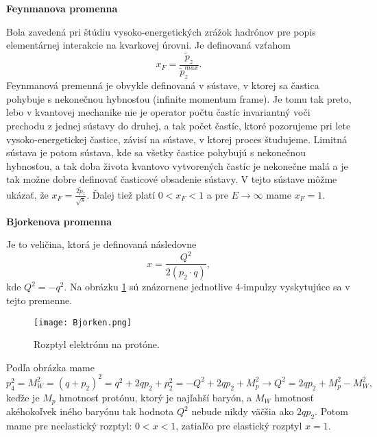 \documentclass[../../main.tex]{subfiles}
\begin{document}
\textbf{Feynmanova promenna}\par
Bola zavedená pri štúdiu vysoko-energetických zrážok hadrónov pre popis elementárnej interakcie na kvarkovej úrovni. Je definovaná vzťahom $$ x_F=\frac{\tilde{p}_z}{\tilde{p}_z^{max}}. $$
Feynmanová premenná je obvykle definovaná v sústave, v ktorej sa častica pohybuje s nekonečnou hybnosťou (infinite momentum frame). Je tomu tak preto, lebo v kvantovej mechanike nie je operator počtu častíc invariantný voči prechodu z jednej sústavy do druhej, a tak počet častíc, ktoré pozorujeme pri lete vysoko-energetickej častice, závisí na sústave, v ktorej proces študujeme. Limitná sústava je potom sústava, kde sa všetky častice pohybujú s nekonečnou hybnosťou, a tak doba života kvantovo vytvorených častíc je nekonečne malá a je tak možne dobre definovať časticové obsadenie sústavy. V tejto sústave môžme ukázať, že $x_F=\frac{2\tilde{p}_z}{\sqrt{s}}.$ Ďalej tiež platí $0<x_F<1$ a pre $E\rightarrow \infty$ mame $x_F=1$.\newline

\textbf{Bjorkenova promenna}\par
Je to veličina, ktorá je definovaná následovne $$ x=\frac{Q^2}{2(p_2\cdot q)}, $$ kde $Q^2=-q^2$. Na obrázku \ref{sf1:fig:Bjorken} sú znázornene jednotlive 4-impulzy vyskytujúce sa v tejto premenne.
\begin{figure}[!h]
\centering
\texttt{[image: Bjorken.png]}
\caption{Rozptyl elektrónu na protóne.}
\label{sf1:fig:Bjorken}
\end{figure}
Podľa obrázka mame
$$ p_4^2=M_W^2=(q+p_2)^2=q^2+2qp_2+p_2^2=-Q^2+2qp_2+M_p^2\rightarrow Q^2=2qp_2+M_p^2-M_W^2,$$
keďže je $M_p$ hmotnosť protónu, ktorý je najľahší baryón, a $M_W$ hmotnosť akéhokoľvek iného baryónu tak hodnota $Q^2$ nebude nikdy väčšia ako $2qp_2$.
Potom mame pre neelastický rozptyl: $0<x<1$, zatiaľčo pre elastický rozptyl $x=1$.
\end{document}
